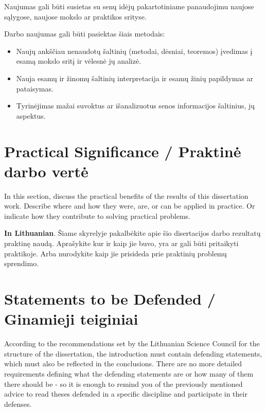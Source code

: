 Naujumas gali būti susietas su senų idėjų pakartotiniame panaudojimu naujose sąlygose, naujose mokslo ar praktikos srityse.

Darbo naujumas gali būti pasiektas šiais metodais:
\begin{itemize}
    \item Naujų ankščiau nenaudotų šaltinių (metodai, dėsniai, teoremos) įvedimas į esamą mokslo sritį ir vėlesnė jų analizė.
    \item Nauja esamų ir žinomų šaltinių interpretacija ir esamų žinių papildymas ar pataisymas.
    \item Tyrinėjimas mažai suvoktus ar išanalizuotus senos informacijos šaltinius, jų aspektus.
\end{itemize}



\section*{Practical Significance / Praktinė darbo vertė}  %

In this section, discuss the practical benefits of the results of this dissertation work. Describe where and how they were, are, or can be applied in practice. Or indicate how they contribute to solving practical problems.

\textbf{In Lithuanian}. 
Šiame skyrelyje pakalbėkite apie šio disertacijos darbo rezultatų praktinę naudą. Aprašykite kur ir kaip jie buvo, yra ar gali būti pritaikyti praktikoje. Arba nurodykite kaip jie prisideda prie praktinių problemų sprendimo.

\section*{Statements to be Defended / Ginamieji teiginiai}

According to the recommendations set by the Lithuanian Science Council for the structure of the dissertation, the introduction must contain defending statements, which must also be reflected in the conclusions.
There are no more detailed requirements defining what the defending statements are or how many of them there should be - so it is enough to remind you of the previously mentioned advice to read theses defended in a specific discipline and participate in their defenses.


